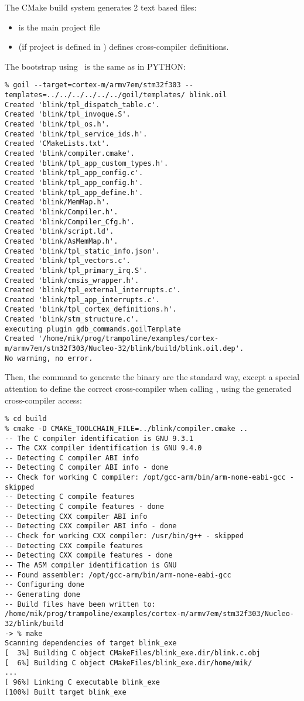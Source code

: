 The CMake build system generates 2 text based files:
\begin{itemize}
	\item {} is the main project file
	\item {} (if project is defined in ) defines cross-compiler definitions.
\end{itemize}

The bootstrap using \goil\ is the same as in PYTHON:
\begin{verbatim}
% goil --target=cortex-m/armv7em/stm32f303 --templates=../../../../../../goil/templates/ blink.oil
Created 'blink/tpl_dispatch_table.c'.
Created 'blink/tpl_invoque.S'.
Created 'blink/tpl_os.h'.
Created 'blink/tpl_service_ids.h'.
Created 'CMakeLists.txt'.
Created 'blink/compiler.cmake'.
Created 'blink/tpl_app_custom_types.h'.
Created 'blink/tpl_app_config.c'.
Created 'blink/tpl_app_config.h'.
Created 'blink/tpl_app_define.h'.
Created 'blink/MemMap.h'.
Created 'blink/Compiler.h'.
Created 'blink/Compiler_Cfg.h'.
Created 'blink/script.ld'.
Created 'blink/AsMemMap.h'.
Created 'blink/tpl_static_info.json'.
Created 'blink/tpl_vectors.c'.
Created 'blink/tpl_primary_irq.S'.
Created 'blink/cmsis_wrapper.h'.
Created 'blink/tpl_external_interrupts.c'.
Created 'blink/tpl_app_interrupts.c'.
Created 'blink/tpl_cortex_definitions.h'.
Created 'blink/stm_structure.c'.
executing plugin gdb_commands.goilTemplate
Created '/home/mik/prog/trampoline/examples/cortex-m/armv7em/stm32f303/Nucleo-32/blink/build/blink.oil.dep'.
No warning, no error.
\end{verbatim}

Then, the command to generate the binary are the standard way, except a special attention to define the correct cross-compiler when calling , using the generated cross-compiler access: 


\begin{verbatim}
% cd build    
% cmake -D CMAKE_TOOLCHAIN_FILE=../blink/compiler.cmake ..
-- The C compiler identification is GNU 9.3.1
-- The CXX compiler identification is GNU 9.4.0
-- Detecting C compiler ABI info
-- Detecting C compiler ABI info - done
-- Check for working C compiler: /opt/gcc-arm/bin/arm-none-eabi-gcc - skipped
-- Detecting C compile features
-- Detecting C compile features - done
-- Detecting CXX compiler ABI info
-- Detecting CXX compiler ABI info - done
-- Check for working CXX compiler: /usr/bin/g++ - skipped
-- Detecting CXX compile features
-- Detecting CXX compile features - done
-- The ASM compiler identification is GNU
-- Found assembler: /opt/gcc-arm/bin/arm-none-eabi-gcc
-- Configuring done
-- Generating done
-- Build files have been written to: /home/mik/prog/trampoline/examples/cortex-m/armv7em/stm32f303/Nucleo-32/blink/build
-> % make
Scanning dependencies of target blink_exe
[  3%] Building C object CMakeFiles/blink_exe.dir/blink.c.obj
[  6%] Building C object CMakeFiles/blink_exe.dir/home/mik/
...
[ 96%] Linking C executable blink_exe
[100%] Built target blink_exe
\end{verbatim}

